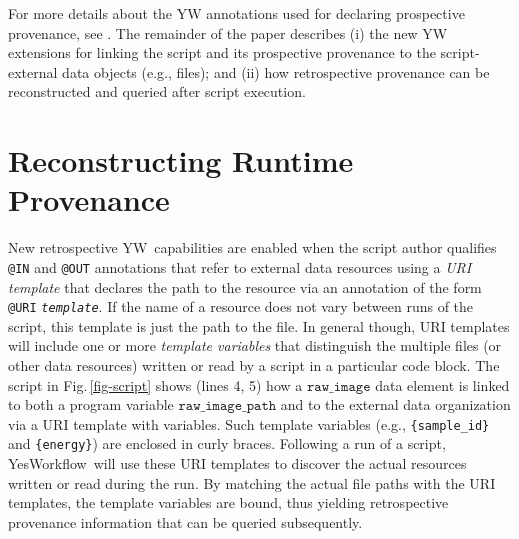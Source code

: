 \documentclass[nocopyrightspace]{sigplanconf}
\newcommand{\figref}[1]{Fig.\,\ref{#1}}
\newcommand{\code}[1]{\ensuremath{\mathtt{#1}}}
\newcommand{\YW}{\textsf{YesWorkflow}}
\newcommand{\yw}{\textsf{YW}}
\newcommand{\ywa}[1]{\texttt{#1}}
\begin{document}
For more details about the YW annotations used for declaring
prospective provenance, see \cite{mcphillips2015ywIJDC}.  The
remainder of the paper describes (i) the new YW extensions for linking
the script and its prospective provenance to the script-external data
objects (e.g., files); and (ii) how retrospective provenance can be
reconstructed and queried after script execution.



\section{Reconstructing Runtime Provenance}
\label{sec:reconstr-retr-prov}

New retrospective \yw\ capabilities are enabled when the script author
qualifies \ywa{@IN} and \ywa{@OUT} annotations that refer to external
data resources using a \emph{URI template} that declares the path to the resource via
an annotation of the form
\ywa{@URI}\,\textvisiblespace\,\ywa{\emph{template}}.  If the name of
a resource does not vary between runs of the script, this template is
just the path to the file.  In general though, URI templates will
include one or more \emph{template variables} that distinguish the
multiple files (or other data resources) written or read by a script
in a particular code block.  The script in \figref{fig-script} shows
(lines 4, 5) how a \code{raw\_image} data element is linked to both a
program variable \code{raw\_image\_path} and to the external data
organization via a URI template with variables. Such template variables (e.g.,
\verb|{sample_id}| and \verb|{energy}|) are enclosed in curly braces.
Following a run of a script, \YW\ will use these URI templates to
discover the actual resources written or read during the run.  By
matching the actual file paths with the URI templates, the template
variables are bound, thus yielding retrospective provenance
information that can be queried subsequently.
\end{document}
